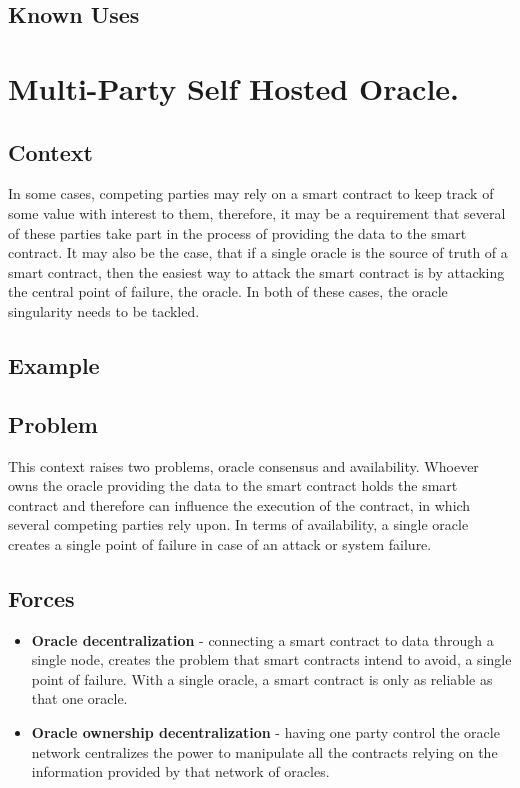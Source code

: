 \subsection{Known Uses}

\section{Multi-Party Self Hosted Oracle.}\label{MPSelfHostedOracle}

\subsection{Context}
In some cases, competing parties may rely on a smart contract to keep track of some value with interest to them, therefore, it may be a requirement that several of these parties take part in the process of providing the data to the smart contract. It may also be the case, that if a single oracle is the source of truth of a smart contract, then the easiest way to attack the smart contract is by attacking the central point of failure, the oracle. In both of these cases, the oracle singularity needs to be tackled.

\subsection{Example}

\subsection{Problem}
This context raises two problems, oracle consensus and availability. Whoever owns the oracle providing the data to the smart contract holds the smart contract and therefore can influence the execution of the contract, in which several competing parties rely upon. In terms of availability, a single oracle creates a single point of failure in case of an attack or system failure.

\subsection{Forces}
\begin{itemize}
  \item \textbf{Oracle decentralization} - connecting a smart contract to data through a single node, creates the problem that smart contracts intend to avoid, a single point of failure. With a single oracle, a smart contract is only as reliable as that one oracle.
  \item \textbf{Oracle ownership decentralization} - having one party control the oracle network centralizes the power to manipulate all the contracts relying on the information provided by that network of oracles.
\end{itemize}

